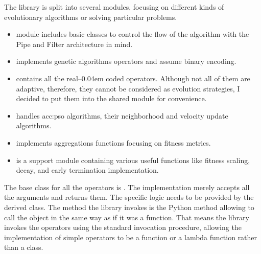 The library is split into several modules, focusing on different kinds of evolutionary algorithms or solving particular problems.
\begin{itemize}
    \item {} module includes basic classes to control the flow of the algorithm with the Pipe and Filter architecture in mind.
    \item {} implements genetic algorithms operators and assume binary encoding.
    \item {} contains all the real--\kern0.04em coded operators. Although not all of them are adaptive, therefore, they cannot be considered as evolution strategies, I decided to put them into the shared module for convenience.
    \item {} handles \acrlong{acc:pso} algorithms, their neighborhood and velocity update algorithms.
    \item {} implements aggregations functions focusing on fitness metrics.
    \item {} is a support module containing various useful functions like fitness scaling, decay, and early termination implementation.
\end{itemize}

The base class for all the operators is . The implementation merely accepts all the arguments and returns them. The specific logic needs to be provided by the derived class. The method the library invokes is the Python  method allowing to call the object in the same way as if it was a function. That means the library invokes the operators using the standard invocation procedure, allowing the implementation of simple operators to be a function or a lambda function rather than a class.

